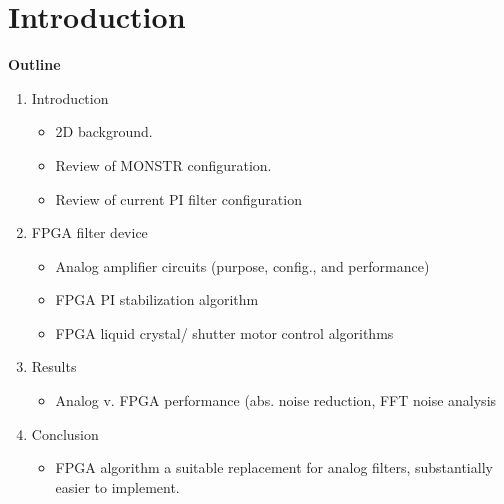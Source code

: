 \documentclass[letterpaper,12pt,amsmath,reprint,aip,jmp,onecolumn]{revtex4-1}
\begin{document}
\section{Introduction}
\Large{\textbf{Outline}}\\
\begin{enumerate}
\item Introduction
\begin{itemize}
\item 2D background.
\item Review of MONSTR configuration.
\item Review of current PI filter configuration
\end{itemize}
\item FPGA filter device
\begin{itemize}
\item Analog amplifier circuits (purpose, config., and performance)
\item FPGA PI stabilization algorithm
\item FPGA liquid crystal/ shutter motor control algorithms
\end{itemize}

\item Results
\begin{itemize}
\item Analog v. FPGA performance (abs. noise reduction, FFT noise analysis
\end{itemize}
\item Conclusion
\begin{itemize}
\item FPGA algorithm a suitable replacement for analog filters, substantially easier to implement.
\end{itemize}
\end{enumerate}
\end{document}

